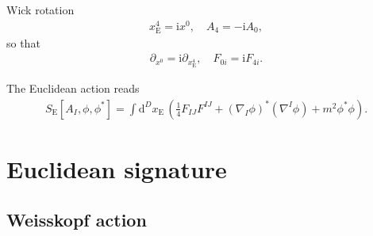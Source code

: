 \documentclass[12pt]{article}
\newcommand\mi{\mathrm{i}} %
\newcommand\dif{\mathrm{d}}
\newcommand{\rbr}[1]{{\left(#1\right)}}
\newcommand{\sfun}[2]{{#1}\mathopen{}\left[#2\right]\mathclose{}}
\begin{document}
Wick rotation
\begin{align}
x_\text{E}^4 = \mi x^0,\quad A_4 = -\mi A_0,
\end{align}
so that
\begin{align}
\partial_{x^0} = \mi \partial_{x_\text{E}^4},\quad
F_{0i} = \mi F_{4i}.
\end{align}

The Euclidean action reads
\begin{align}
\sfun{S_\text{E}}{A_I,\phi,\phi^*} = \int \dif^{D} x_\text{E}\,\rbr{
	\frac{1}{4} F_{IJ} F^{IJ} + \rbr{\nabla_{\!I}\phi}^* \rbr{\nabla^I \phi} 
	+ m^2 \phi^* \phi}.
\end{align}


\section{Euclidean signature}
\label{sec:eucl}

\subsection{Weisskopf action}
\label{ssec:eucl-weis}
\end{document}
